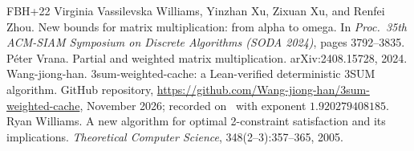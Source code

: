 \documentclass[11pt]{article}
\theoremstyle{definition}
\theoremstyle{remark}
\begin{document}
{\begin{thebibliography}{FBH{+}22}
 Virginia Vassilevska Williams, Yinzhan Xu, Zixuan Xu, and Renfei Zhou. New bounds for matrix multiplication: from alpha to omega. In \emph{Proc.\ 35th ACM-SIAM Symposium on Discrete Algorithms (SODA 2024)}, pages 3792--3835.
 Péter Vrana. Partial and weighted matrix multiplication. arXiv:2408.15728, 2024.
 Wang-jiong-han. 3sum-weighted-cache: a Lean-verified deterministic 3SUM algorithm. GitHub repository, \url{https://github.com/Wang-jiong-han/3sum-weighted-cache}, November 2026; recorded on~\cite{BOS26} with exponent $1.920279408185$.
 Ryan Williams. A new algorithm for optimal 2-constraint satisfaction and its implications. \emph{Theoretical Computer Science}, 348(2--3):357--365, 2005.
\end{thebibliography}}
\end{document}
